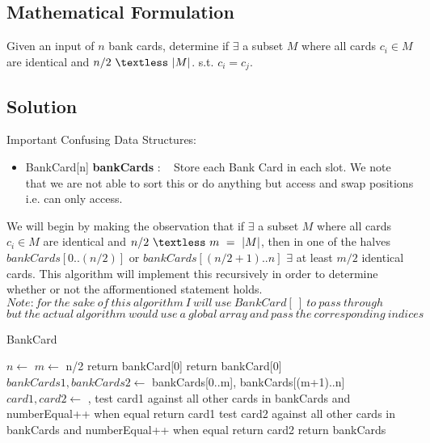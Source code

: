 \documentclass[12pt]{article}
\begin{document}
\newpage

\subsection{Mathematical Formulation}
Given an input of $n$ bank cards, determine if $\exists$ a subset $M$
where all cards $c_i \in M$ are identical and $n/2\ \textless\ |M|$.
s.t. $c_i = c_j$.

\subsection{Solution}
Important Confusing Data Structures:
\begin{itemize}
    \item BankCard[n] \textbf{bankCards} : ~ Store each Bank Card in
    each slot. We note that we are not able to sort this or do anything
    but access and swap positions i.e. can only access.
\end{itemize}

We will begin by making the observation that if $\exists$ a subset $M$
where all cards $c_i \in M$ are identical and $n/2\ \textless\ m\ =\ |M|$,
then in one of the halves $bankCards[0..(n/2)]$ or $bankCards[(n/2+1)..n]$
$\exists$ at least $m/2$ identical cards. This algorithm will implement
this recursively in order to determine whether or not the afformentioned
statement holds. $Note: for\ the\ sake\ of\ this\ algorithm\ I\ will\ use\ BankCard[\ ]\
to\ pass\ through$ $but\ the\ actual\ algorithm\ would\ use\ a\ global\
array\ and\ pass\ the\ corresponding\ indices$

\begin{algorithm}[H]
\caption{BankCard}
\begin{algorithmic}
        \State $n \gets$ 
        \State $m \gets$ n/2
        \If{n == 1}
            \State return bankCard[0]
                \State return bankCard[0]
            \EndIf
        \EndIf
        \State $bankCards1, bankCards2 \gets$ bankCards[0..m], bankCards[(m+1)..n]
        \State $card1, card2 \gets$ , 
        \If{card1 is a card}
            \State test card1 against all other cards in bankCards and numberEqual++ when equal
                \State return card1
            \EndIf
        \EndIf
            \State test card2 against all other cards in bankCards and numberEqual++ when equal
                \State return card2
            \EndIf
        \EndIf
        \State return bankCards
    \EndProcedure
\end{algorithmic}
\end{algorithm}
\end{document}

